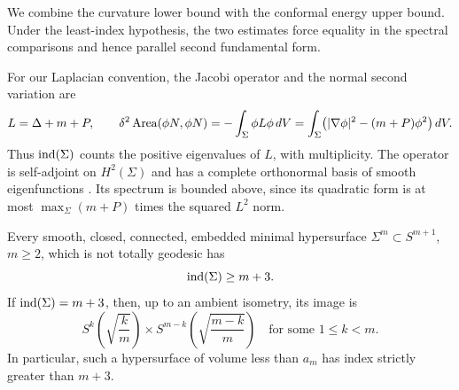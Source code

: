 We combine the curvature lower bound with the conformal energy upper
bound. Under the least-index hypothesis, the two estimates force
equality in the spectral comparisons and hence parallel second
fundamental form.

For our Laplacian convention, the Jacobi operator and the normal second
variation are
\begin{equation}\label{eq:index-jacobi}
 L=\Delta+m+P,\qquad
 \delta^2\operatorname{Area}(\phi N,\phi N)
   =-\int_\Sigma\phi L\phi\,dV
   =\int_\Sigma\bigl(|\nabla\phi|^2-(m+P)\phi^2\bigr)\,dV.
\end{equation}
Thus $\operatorname{ind}(\Sigma)$ counts the positive eigenvalues of $L$, with
multiplicity. The operator is self-adjoint on $H^2(\Sigma)$ and has a
complete orthonormal basis of smooth eigenfunctions
\cite[\S10, equations~(10.7)--(10.11)]{TaylorEllipticNotes}.
Its spectrum is bounded above, since its quadratic form is at most
$\max_\Sigma(m+P)$ times the squared $L^2$ norm.

\begin{proposition}\label{prop:index-rigidity}
Every smooth, closed, connected, embedded minimal hypersurface
$\Sigma^m\subset S^{m+1}$, $m\ge2$, which is not totally geodesic has
\[
 \operatorname{ind}(\Sigma)\ge m+3.
\]
If $\operatorname{ind}(\Sigma)=m+3$, then, up to an ambient isometry, its image is
\[
 S^k\!\left(\sqrt{\frac{k}{m}}\right)
 \times
 S^{m-k}\!\left(\sqrt{\frac{m-k}{m}}\right)
 \quad\text{for some }1\le k<m.
\]
In particular, such a hypersurface of volume less than $a_m$ has
index strictly greater than $m+3$.
\end{proposition}

